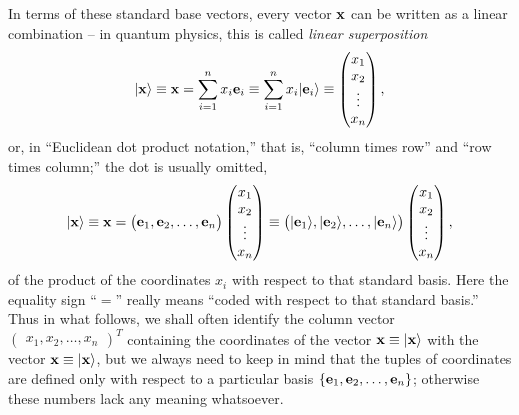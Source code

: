 In terms of these standard base vectors, every vector ${\bf x}$
can be written as a linear combination -- in quantum physics, this is called
{\em linear superposition}
\begin{equation}
\vert {\bf x} \rangle \equiv {\bf x} = \sum_{i=1}^n x_i{\bf e}_i \equiv  \sum_{i=1}^n x_i \vert {\bf e}_i \rangle
\equiv
\begin{pmatrix}x_1\\x_2\\ \vdots \\ x_n\end{pmatrix},
\end{equation}
or, in ``Euclidean dot product notation,''
that is,
``column times row''
and
``row times column;'' the dot is usually omitted,
\begin{equation}
\vert {\bf x} \rangle \equiv {\bf x} =
\begin{pmatrix}{\bf e}_1,{\bf e}_2, \ldots , {\bf e}_n\end{pmatrix}
\begin{pmatrix} x_1\\x_2\\ \vdots \\ x_n \end{pmatrix}
\equiv
\begin{pmatrix} \vert {\bf e}_1\rangle ,\vert {\bf e}_2 \rangle ,  \ldots , \vert {\bf e}_n\rangle \end{pmatrix}
\begin{pmatrix} x_1\\x_2\\ \vdots \\ x_n \end{pmatrix}
,
\end{equation}
of the product of the coordinates $x_i$  with respect to that standard basis.
Here the equality sign ``$=$'' really means ``coded with respect to that standard basis.''
Thus in what follows, we shall often identify the column vector
$
\begin{pmatrix}
x_1, x_2, \ldots , x_n
\end{pmatrix}^T
$
containing the coordinates of the vector ${\bf x}\equiv \vert {\bf x} \rangle$
with the vector ${\bf x}\equiv \vert {\bf x} \rangle$, but we always need to keep in mind that
the tuples of coordinates are defined only with respect to a particular basis
$\{ {\bf e}_1,{\bf e}_2, \ldots , {\bf e}_n \}$; otherwise these numbers lack any meaning whatsoever.


